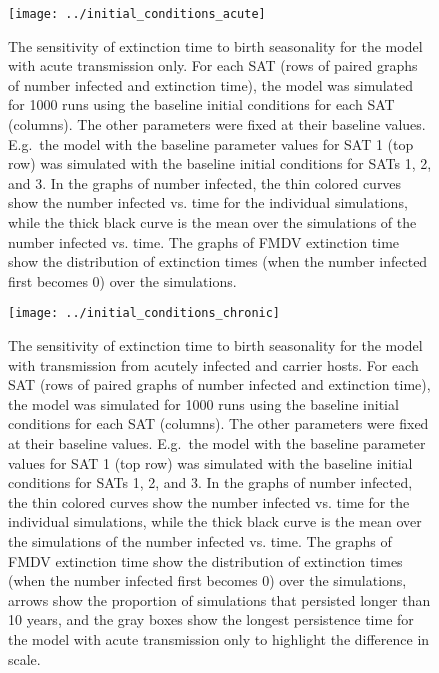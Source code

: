 \documentclass[12pt, USenglish]{article}  %
\newcommand{\appendixprefix}{S}
\renewcommand{\thesection}{\appendixprefix\arabic{section}}
\newcommand{\bibtitle}{References for \thesection}
\begin{document}
\begin{figure}
  \centering
  \texttt{[image: ../initial\_conditions\_acute]}
  \caption{The sensitivity of extinction time to birth seasonality for
    the model with acute transmission only.
    For each SAT (rows of paired graphs of number infected and
    extinction time), the model was simulated for 1000 runs using the
    baseline initial conditions for each SAT (columns).
    The other parameters were fixed at their baseline values.
    E.g.~the model with the baseline parameter values for SAT 1 (top
    row) was simulated with the baseline initial conditions for SATs
    1, 2, and 3.
    In the graphs of number infected, the thin colored curves show the
    number infected vs. time for the individual simulations, while the
    thick black curve is the mean over the simulations of the number
    infected vs. time.
    The graphs of FMDV extinction time show the distribution of
    extinction times (when the number infected first becomes 0) over
    the simulations.}
  \label{fig:initial_conditions_acute}
\end{figure}

\begin{figure}
  \centering
  \texttt{[image: ../initial\_conditions\_chronic]}
  \caption{The sensitivity of extinction time to birth seasonality for
    the model with transmission from acutely infected and carrier hosts.
    For each SAT (rows of paired graphs of number infected and
    extinction time), the model was simulated for 1000 runs using the
    baseline initial conditions for each SAT (columns).
    The other parameters were fixed at their baseline values.
    E.g.~the model with the baseline parameter values for SAT 1 (top
    row) was simulated with the baseline initial conditions for SATs
    1, 2, and 3.
    In the graphs of number infected, the thin colored curves show the
    number infected vs. time for the individual simulations, while the
    thick black curve is the mean over the simulations of the number
    infected vs. time.
    The graphs of FMDV extinction time show the distribution of
    extinction times (when the number infected first becomes 0) over
    the simulations, arrows show the
    proportion of simulations that persisted longer than 10 years,
    and the gray boxes show the longest persistence time for the
    model with acute transmission only to highlight the difference in
    scale.}
  \label{fig:initial_conditions_chronic}
\end{figure}


\clearpage
\printbibliography[title=\bibtitle]
\end{document}
